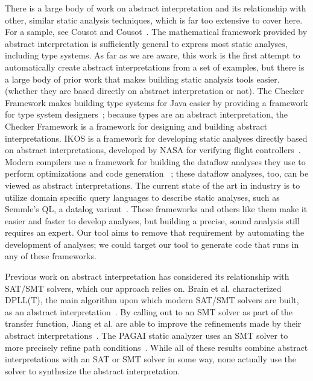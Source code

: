 \documentclass[10pt,conference]{IEEEtran}
\begin{document}
There is a large body of work on abstract interpretation and its relationship
with other, similar static analysis techniques, which is far
too extensive to cover here.
For a sample, see Cousot and Cousot~\cite{cousot14}.
The mathematical framework provided by abstract interpretation is sufficiently
general to express most static analyses, including type systems.
As far as we are aware, this work is the first attempt to automatically
create abstract interpretations from a set of examples, but there is a
large body of prior work that makes building static analysis tools easier.
(whether they are based directly on abstract interpretation or not).
The Checker Framework makes building type systems for Java easier
by providing a framework for type system designers~\cite{checker-framework};
because types are an abstract interpretation, the Checker Framework
is a framework for designing and building abstract interpretations.
IKOS is a framework for developing static analyses directly based on
abstract interpretations, developed by NASA for verifying flight
controllers~\cite{ikos}. Modern compilers use a framework for building
the dataflow analyses they use to perform optimizations and code generation
~\cite{lattner04:_llvm}; these dataflow analyses, too, can be viewed as
abstract interpretations. The current state of the art in industry is to
utilize domain specific query languages to describe static analyses, such as 
Semmle's QL, a datalog variant~\cite{semmle-ql-primer}.
These frameworks and others like them make it easier and faster to develop analyses, but 
building a precise, sound analysis still requires an expert.  Our tool 
aims to remove that requirement by automating the development of analyses; 
we could target our tool to generate code that runs in any of these frameworks.

Previous work on abstract interpretation has considered its relationship
with SAT/SMT solvers, which our approach relies on. Brain et al. characterized
DPLL(T), the main algorithm upon which modern SAT/SMT solvers are built,
as an abstract interpretation~\cite{brain2013abstract}. By calling out to
an SMT solver as part of the transfer function, Jiang et al. are able to
improve the refinements made by their abstract
interpretations~\cite{jiang2017block}. The PAGAI static analyzer uses
an SMT solver to more precisely refine path conditions~\cite{pagai}.
While all of these results combine abstract interpretations with
an SAT or SMT solver in some way, none actually use the solver to
synthesize the abstract interpretation.
\end{document}

